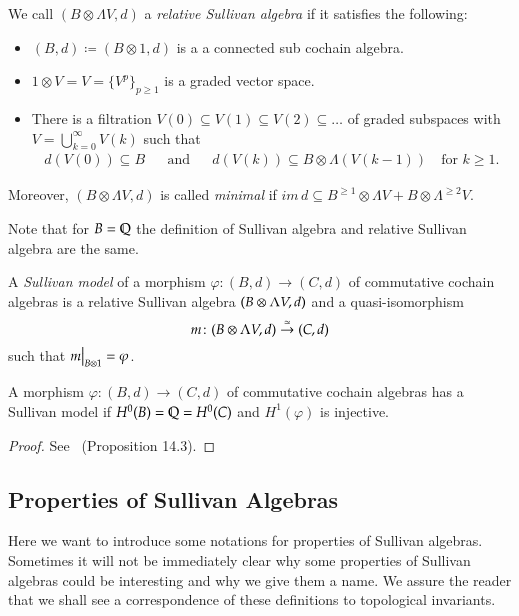 \begin{Definition}
 We call $(B \otimes \Lambda V,d)$ a \emph{relative Sullivan algebra} if it satisfies the following:
 
 \begin{itemize}
  \item $(B,d) \coloneqq (B \otimes 1, d)$ is a a connected sub cochain algebra.
  \item $1 \otimes V = V = { \lbrace V^p \rbrace}_{ p \geq 1}$ is a graded vector space.
  \item There is a filtration $V(0) \subseteq V(1) \subseteq V(2) \subseteq \ldots$ of graded subspaces
    with  $ V = \bigcup_{k = 0}^{\infty} V(k)$ such that 
    \begin{align*}
     d(V(0)) \subseteq B &  & \text{and} & & d(V(k)) \subseteq B \otimes \Lambda (V(k-1)) \quad \text{for $k \geq 1$.}
    \end{align*}
 \end{itemize}
 Moreover, $(B \otimes \Lambda V,d)$ is called \emph{minimal} if 
 $im \, d \subseteq B^{\geq 1} \otimes \Lambda V + B \otimes \Lambda^{\geq 2} V$.
\end{Definition}

\begin{Remark}
 Note that for $B = \mathbb{Q}$ the definition of Sullivan algebra and relative Sullivan algebra are the same.
\end{Remark}

\begin{Definition}

 A \emph{Sullivan model} of a morphism $\varphi \colon (B,d) \to (C,d)$ of commutative cochain algebras is
 a relative Sullivan algebra $(B \otimes \Lambda V,d)$ and a quasi-isomorphism
 $$ m \colon (B \otimes \Lambda V,d) \overset{\simeq}{\to} (C,d) $$
 such that $\restr{m}{B \otimes 1} = \varphi$.
\end{Definition}

\begin{Proposition}
\label{prop:ExistenceMorphismSullivanModels}
 A morphism $\varphi \colon (B,d) \to (C,d)$ of commutative cochain algebras has a Sullivan model
 if $H^0(B) = \mathbb{Q} = H^0(C)$ and $H^1(\varphi)$ is injective.
\end{Proposition}
\begin{proof}
 See~\cite{Felix2001} (Proposition 14.3).
\end{proof}

\subsection{Properties of Sullivan Algebras}
Here we want to introduce some notations for properties of Sullivan algebras. Sometimes it will not be
immediately clear why some properties of Sullivan algebras could be interesting and why we give them a name. We assure
the reader that we shall see a correspondence of these definitions to topological invariants.

